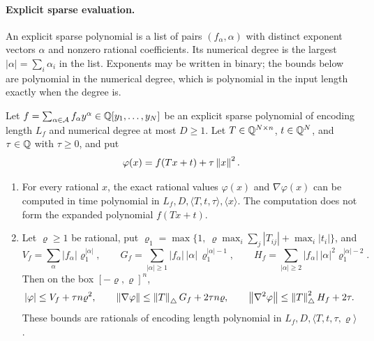 \paragraph{Explicit sparse evaluation.}
An explicit sparse polynomial is a list of pairs $(f_\alpha,\alpha)$ with
distinct exponent vectors $\alpha$ and nonzero rational coefficients. Its
numerical degree is the largest $|\alpha|=\sum_i\alpha_i$ in the list.
Exponents may be written in binary; the bounds below are polynomial in the
numerical degree, which is polynomial in the input length exactly when the
degree is.

\begin{lemma}\label{lem:points-sparse}
Let $f=\sum_{\alpha\in\mathcal A}f_\alpha y^\alpha\in\mathbb Q[y_1,\ldots,y_N]$
be an explicit sparse polynomial of encoding length $L_f$ and numerical
degree at most $D\ge1$. Let $T\in\mathbb Q^{N\times n}$, $t\in\mathbb Q^N$, and
$\tau\in\mathbb Q$ with $\tau\ge0$, and put
\[
 \varphi(x)=f(Tx+t)+\tau\left\lVert x\right\rVert^2 .
\]
\begin{enumerate}[label=(\alph*)]
\item For every rational $x$, the exact rational values $\varphi(x)$ and
$\nabla\varphi(x)$ can be computed in time polynomial in
$L_f,D,\langle T,t,\tau\rangle,\langle x\rangle$. The computation does not
form the expanded polynomial $f(Tx+t)$.
\item Let $\varrho\ge1$ be rational, put
$\varrho_1=\max\{1,\ \varrho\max_i\sum_j|T_{ij}|+\max_i|t_i|\}$, and
\[
 V_f=\sum_{\alpha}|f_\alpha|\varrho_1^{|\alpha|},\qquad
 G_f=\sum_{|\alpha|\ge1}|f_\alpha|\,|\alpha|\,\varrho_1^{|\alpha|-1},\qquad
 H_f=\sum_{|\alpha|\ge2}|f_\alpha|\,|\alpha|^2\varrho_1^{|\alpha|-2}.
\]
Then on the box $[-\varrho,\varrho]^n$,
\[
 |\varphi|\le V_f+\tau n\varrho^2,\qquad
 \left\lVert\nabla\varphi\right\rVert\le\left\lVert T\right\rVert_\triangle G_f+2\tau n\varrho,\qquad
 \left\lVert\nabla^2\varphi\right\rVert\le\left\lVert T\right\rVert_\triangle^2H_f+2\tau .
\]
These bounds are rationals of encoding length polynomial in
$L_f,D,\langle T,t,\tau,\varrho\rangle$.
\end{enumerate}
\end{lemma}

